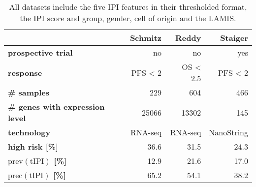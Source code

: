 \begin{table}[ht]
    \small
    \centering
    \begin{tabular}{lrrr}
        \hline
        & \textbf{Schmitz} \cite{schmitz18} & \textbf{Reddy} \cite{reddy17} & 
            \textbf{Staiger} \cite{staiger20} \\
        \hline
        \textbf{prospective trial} & no & no & yes \\
        \textbf{response} & PFS < 2 & OS < \num{2.5} & PFS < 2 \\
        \textbf{\# samples} & \num{229} & \num{604} & \num{466} \\
        \textbf{\# genes with expression level} & \num{25066} & \num{13302} & \num{145} \\
        \textbf{technology} & RNA-seq & RNA-seq & NanoString \\
        \textbf{high risk [\%]} & \num{36.6} & \num{31.5} & \num{24.3} \\
        \textbf{$\text{prev}(\text{tIPI})$ [\%]} & \num{12.9} & \num{21.6} & \num{17.0} \\
        \textbf{$\text{prec}(\text{tIPI})$ [\%]} & \num{65.2} & \num{54.1} & \num{38.2} \\
        \hline
    \end{tabular}
    \caption{All datasets include the five IPI features in their 
        thresholded format, the IPI score and group, gender, cell of origin and the LAMIS.}
        \label{table:data}
\end{table}
